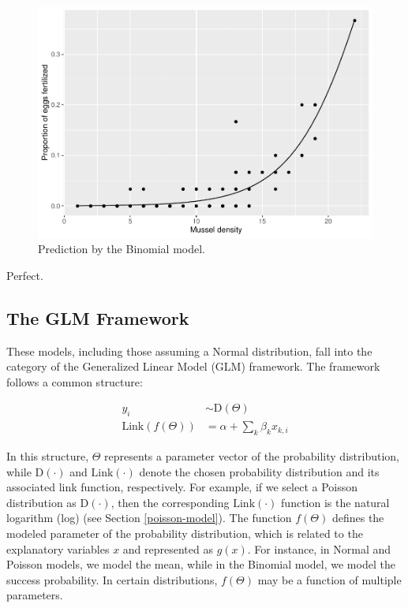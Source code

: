 \documentclass[
]{article}
\begin{document}
\begin{figure}

{\centering \includegraphics{biostats_files/figure-latex/binom-fit-figure-1} 

}

\caption{Prediction by the Binomial model.}\label{fig:binom-fit-figure}
\end{figure}

Perfect.

\hypertarget{the-glm-framework}{%
\subsection{The GLM Framework}\label{the-glm-framework}}

These models, including those assuming a Normal distribution, fall into the category of the Generalized Linear Model (GLM) framework. The framework follows a common structure:

\[
\begin{aligned}
y_i &\sim \text{D}(\Theta)\\
\text{Link}(f(\Theta)) &= \alpha + \sum_k \beta_k x_{k, i}
\end{aligned}
\]

In this structure, \(\Theta\) represents a parameter vector of the probability distribution, while \(\text{D}(\cdot)\) and \(\text{Link}(\cdot)\) denote the chosen probability distribution and its associated link function, respectively. For example, if we select a Poisson distribution as \(\text{D}(\cdot)\), then the corresponding \(\text{Link}(\cdot)\) function is the natural logarithm (log) (see Section \ref{poisson-model}). The function \(f(\Theta)\) defines the modeled parameter of the probability distribution, which is related to the explanatory variables \(x\) and represented as \(g(x)\). For instance, in Normal and Poisson models, we model the mean, while in the Binomial model, we model the success probability. In certain distributions, \(f(\Theta)\) may be a function of multiple parameters.
\end{document}

